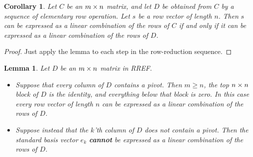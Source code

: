 \documentclass[reqno]{amsart}
\newtheorem{lemma}[theorem]{Lemma}
\newtheorem{corollary}[theorem]{Corollary}
\theoremstyle{definition}
\begin{document}
\begin{corollary}\label{cor-span-invariant}
 Let $C$ be an $m\times n$ matrix, and let $D$ be obtained from $C$ by a
 sequence of elementary row operation.  Let $s$ be a row vector of length
 $n$.  Then $s$ can be expressed as a linear combination of the rows
 of $C$ if and only if it can be expressed as a linear combination of
 the rows of $D$.
\end{corollary}
\begin{proof}
 Just apply the lemma to each step in the row-reduction sequence.
\end{proof}

\begin{lemma}\label{lem-check-span-RREF}
 Let $D$ be an $m\times n$ matrix in RREF.
 \begin{itemize}
  \item[(a)] Suppose that every column of $D$ contains a pivot.  Then
   $m\geq n$, the top $n\times n$ block of $D$ is the identity,  and
   everything below that block is zero.  In this case every row vector
   of length $n$ can be expressed as a linear combination of the rows
   of $D$.
  \item[(b)] Suppose instead that the $k$'th column of $D$ does not contain
   a pivot.  Then the standard basis vector $e_k$ \textbf{cannot} be
   expressed as a linear combination of the rows of $D$.
 \end{itemize}
\end{lemma}
\end{document}

